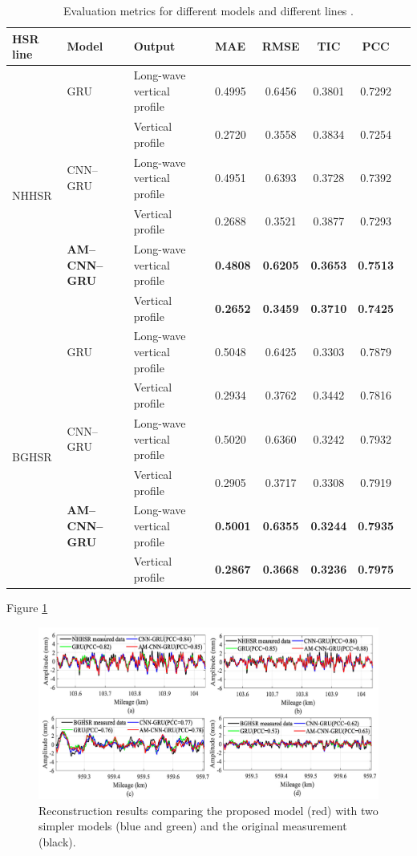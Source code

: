 \begin{table}[H]
\centering
\begin{tabular}{llllcccc}
    \hline
    \textbf{HSR line} & \textbf{Model} & \textbf{Output} & \textbf{MAE} & \textbf{RMSE} & \textbf{TIC} & \textbf{PCC} \\ \hline
    \multirow{6}{*}{NHHSR} 
    & GRU & Long-wave vertical profile & 0.4995 & 0.6456 & 0.3801 & 0.7292 \\
    &     & Vertical profile           & 0.2720 & 0.3558 & 0.3834 & 0.7254 \\
    & CNN--GRU & Long-wave vertical profile & 0.4951 & 0.6393 & 0.3728 & 0.7392 \\
    &     & Vertical profile           & 0.2688 & 0.3521 & 0.3877 & 0.7293 \\
 & \textbf{AM--CNN--GRU} & Long-wave vertical profile & \textbf{0.4808} & \textbf{0.6205} & \textbf{0.3653} & \textbf{0.7513} \\
 &     & Vertical profile           & \textbf{0.2652} & \textbf{0.3459} & \textbf{0.3710} & \textbf{0.7425} \\ \hline
\multirow{6}{*}{BGHSR} 
& GRU & Long-wave vertical profile & 0.5048 & 0.6425 & 0.3303 & 0.7879 \\
 &     & Vertical profile           & 0.2934 & 0.3762 & 0.3442 & 0.7816 \\
 & CNN--GRU & Long-wave vertical profile & 0.5020 & 0.6360 & 0.3242 & 0.7932 \\
 &     & Vertical profile           & 0.2905 & 0.3717 & 0.3308 & 0.7919 \\
 & \textbf{AM--CNN--GRU} & Long-wave vertical profile & \textbf{0.5001} & \textbf{0.6355} & \textbf{0.3244} & \textbf{0.7935} \\
 &     & Vertical profile           & \textbf{0.2867} & \textbf{0.3668} & \textbf{0.3236} & \textbf{0.7975} \\ \hline
\end{tabular}
\caption{Evaluation metrics for different models and different lines \cite{Hao02012023}.}
\label{tab:HAO_evaluation_indices}
\end{table}

Figure \ref{fig:Hao_Results}

\begin{figure}[H]
    \centering
    \includegraphics[width=12cm]{Cap2_LitReview/Track_Quality_Accel/Hao (2023)/Hao_results.png}
    \caption{Reconstruction results comparing the proposed model (red) with two simpler models (blue and green) and the original measurement (black). \cite{Hao02012023}}
    \label{fig:Hao_Results}
\end{figure}

